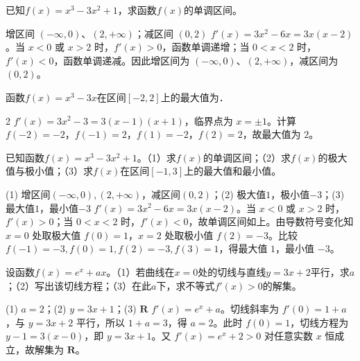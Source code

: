 

\begin{question}[GPT生成]
已知$f(x)=x^3-3x^2+1$，求函数$f(x)$的单调区间。
\end{question}
\begin{answer}{增区间 $(-\infty,0)$、$(2,+\infty)$；减区间 $(0,2)$}
$f'(x)=3x^2-6x=3x(x-2)$。当 $x<0$ 或 $x>2$ 时，$f'(x)>0$，函数单调递增；当 $0<x<2$ 时，$f'(x)<0$，函数单调递减。因此增区间为 $(-\infty,0)$、$(2,+\infty)$，减区间为 $(0,2)$。
\end{answer}

\begin{question}[GPT生成]
函数$f(x)=x^3-3x$在区间$[-2,2]$上的最大值为\blank{3cm}．
\end{question}
\begin{answer}{2}
$f'(x)=3x^2-3=3(x-1)(x+1)$，临界点为 $x=\pm1$。计算 $f(-2)=-2$，$f(-1)=2$，$f(1)=-2$，$f(2)=2$，故最大值为 $2$。
\end{answer}



\begin{question}[GPT生成]
已知函数$f(x)=x^3-3x^2+1$。（1）求$f(x)$的单调区间；（2）求$f(x)$的极大值与极小值；（3）求$f(x)$在区间$[-1,3]$上的最大值和最小值。
\end{question}
\solutionSpace{5cm}
\begin{answer}{(1) 增区间$(-\infty,0),(2,+\infty)$，减区间$(0,2)$；(2) 极大值$1$，极小值$-3$；(3) 最大值$1$，最小值$-3$}
$f'(x)=3x^2-6x=3x(x-2)$。当 $x<0$ 或 $x>2$ 时，$f'(x)>0$；当 $0<x<2$ 时，$f'(x)<0$，故单调区间如上。由导数符号变化知 $x=0$ 处取极大值 $f(0)=1$，$x=2$ 处取极小值 $f(2)=-3$。比较 $f(-1)=-3,f(0)=1,f(2)=-3,f(3)=1$，得最大值 $1$，最小值 $-3$。
\end{answer}

\begin{question}[GPT生成]
设函数$f(x)=e^x+ax$。（1）若曲线在$x=0$处的切线与直线$y=3x+2$平行，求$a$；（2）写出该切线方程；（3）在此$a$下，求不等式$f'(x)>0$的解集。
\end{question}
\solutionSpace{5cm}
\begin{answer}{(1) $a=2$；(2) $y=3x+1$；(3) $\mathbf{R}$}
$f'(x)=e^x+a$。切线斜率为 $f'(0)=1+a$，与 $y=3x+2$ 平行，所以 $1+a=3$，得 $a=2$。此时 $f(0)=1$，切线方程为 $y-1=3(x-0)$，即 $y=3x+1$。又 $f'(x)=e^x+2>0$ 对任意实数 $x$ 恒成立，故解集为 $\mathbf{R}$。
\end{answer}

\printChapterAnswers
